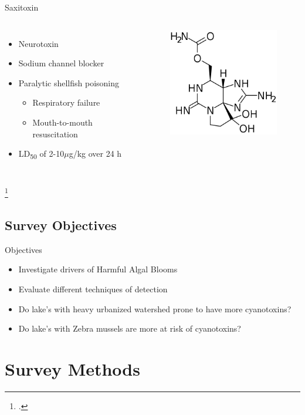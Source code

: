 \begin{frame}{Saxitoxin}
\begin{columns}
	\begin{itemize}
		\item Neurotoxin  
		\item Sodium channel blocker
		\item Paralytic shellfish poisoning
			\begin{itemize}
				\item Respiratory failure 
				\item Mouth-to-mouth resuscitation 
			\end{itemize}
		\item LD\textsubscript{50} of 2-10$\mu$g/kg over 24 h 
	\end{itemize}
	\begin{figure}
		\centering
		\includegraphics[width=2in]{saxitoxin.png}
	\end{figure}
\end{columns}
\footcitetext{saoudi_management_2017}
\end{frame}
\subsection{Survey Objectives}
\begin{frame}{Objectives}
	\begin{itemize}
		\item Investigate drivers of Harmful Algal Blooms 
		\item Evaluate different techniques of detection 
		\item Do lake's with heavy urbanized watershed prone to have more cyanotoxins? 
		\item Do lake's with Zebra mussels are more at risk of cyanotoxins?
	\end{itemize}
\end{frame}
\section{Survey Methods}
